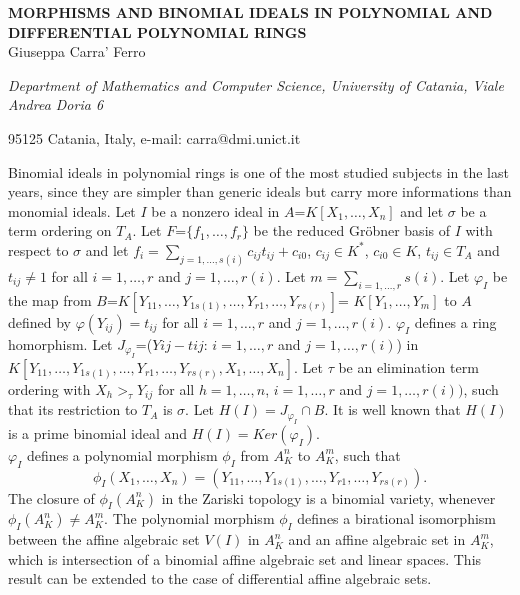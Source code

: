 \documentclass[11pt, draft]{article}
\begin{document}

\begin{center}
{\bf
MORPHISMS AND BINOMIAL IDEALS IN POLYNOMIAL AND DIFFERENTIAL
POLYNOMIAL RINGS}\\
\vspace {0.3cm}
{Giuseppa Carra' Ferro}\\
{\it \small Department of Mathematics and Computer Science,
University of Catania, Viale Andrea Doria 6

95125 Catania, Italy, e-mail: carra@dmi.unict.it
}
\end{center}
\newtheorem{definition}{DEFINITION}
\newtheorem{theorem}{THEOREM}
\newtheorem{example}{EXAMPLE}
\newtheorem{remark}{REMARK}
\newtheorem{proposition}{PROPOSITION}
\newtheorem{corollary}{COROLLARY}
\vspace {1.0cm}
Binomial ideals in polynomial rings is one of the most studied subjects
in the last years, since they are simpler than generic ideals but carry
more informations than monomial ideals.
Let $I$ be a nonzero ideal in $A$=$K[X_1,\ldots,X_n]$ and let $\sigma$ be a
term ordering on $T_{A}$. Let
$F$=$\{f_{1},\ldots,f_{r}\}$ be the reduced Gr\"{o}bner basis of $I$
with respect to  $\sigma$ and let $f_{i}=\sum_{j=1,\ldots,s(i)}c_{ij}t_{ij}+
c_{i0}$, $c_{ij} \in K^{*}$, $c_{i0} \in K$, $t_{ij} \in T_{A}$ and
$t_{ij} \neq 1$ for all $i=1,\ldots,r$ and $j=1,\ldots,r(i)$.
Let $m=\sum_{i=1,\ldots,r}s(i)$. Let $\varphi_{I}$ be the map from
$B$=$K[Y_{11},\ldots,Y_{1s(1)},\ldots,Y_{r1},\ldots,Y_{rs(r)}]$=
$K[Y_1,\ldots,Y_m]$ to $A$ defined by $\varphi(Y_{ij})=t_{ij}$ for all
$i=1,\ldots,r$ and $j=1,\ldots,r(i)$.
$\varphi_{I}$ defines a ring homorphism.
Let $J_{\varphi_{I}}$=($Yij-tij$: $i=1,\ldots,r$ and $j=1,\ldots,r(i)$) in
$K[Y_{11},\ldots,Y_{1s(1)},\ldots,Y_{r1},\ldots,Y_{rs(r)},X_1,\ldots,X_n]$.
Let $\tau$ be an elimination term ordering with $X_{h} >_{\tau} Y_{ij}$ for
all $h=1,\ldots,n$, $i=1,\ldots,r$ and $j=1,\ldots,r(i))$, such that its restriction to
$T_{A}$ is $\sigma$. Let $H(I)=J_{\varphi_{I}} \cap B$.
It is well known that $H(I)$ is a prime binomial ideal and
$H(I)=Ker(\varphi_{I})$.\\
$\varphi_{I}$ defines a polynomial morphism $\phi_{I}$ from $A^{n}_{K}$
to $A^{m}_{K}$, such that
$$\phi_{I} (X_1,\ldots,X_n)=
(Y_{11},\ldots,Y_{1s(1)},\ldots,Y_{r1},\ldots,Y_{rs(r)}).$$
The closure of $\phi_{I} (A^{n}_{K})$ in the Zariski
topology is a binomial variety, whenever $\phi_{I} (A^{n}_{K}) \neq A^{m}_{K}$.
The polynomial morphism $\phi_{I}$ defines a birational isomorphism between the
affine algebraic set $V(I)$ in $A^{n}_{K}$ and an affine algebraic set
in $A^{m}_{K}$, which is intersection of a binomial affine algebraic set
and linear spaces. This result can be extended to the case of differential
affine algebraic sets.
\end{document}
